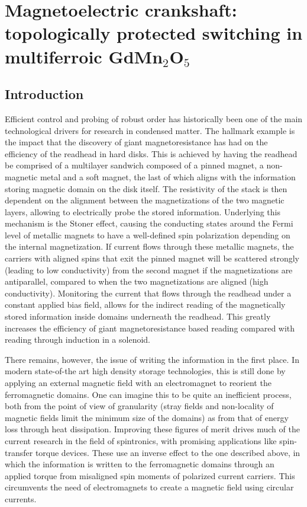 \newcommand{\Jpar}{J_{||}}
\newcommand{\Jperp}{J_{\perp}}
\chapter{Magnetoelectric crankshaft: topologically protected switching in multiferroic GdMn$_2$O$_5$ \label{ch:GdMn2O5}}
\section{Introduction}
Efficient control and probing of robust order has historically been one of the main technological drivers for research in condensed matter.
The hallmark example is the impact that the discovery of giant magnetoresistance has had on the efficiency of the readhead in hard disks.
This is achieved by having the readhead be comprised of a multilayer sandwich composed of a pinned magnet, a non-magnetic metal and a soft magnet, the last of which aligns with the information storing magnetic domain on the disk itself.
The resistivity of the stack is then dependent on the alignment between the magnetizations of the two magnetic layers, allowing to electrically probe the stored information. 
Underlying this mechanism is the Stoner effect, causing the conducting states around the Fermi level of metallic magnets to have a well-defined spin polarization depending on the internal magnetization.
If current flows through these metallic magnets, the carriers with aligned spins that exit the pinned magnet will be scattered strongly (leading to low conductivity) from the second magnet if the magnetizations are antiparallel, compared to when the two magnetizations are aligned (high conductivity).
Monitoring the current that flows through the readhead under a constant applied bias field, allows for the indirect reading of the magnetically stored information inside domains underneath the readhead.
This greatly increases the efficiency of giant magnetoresistance based reading compared with reading through induction in a solenoid.

There remains, however, the issue of writing the information in the first place.
In modern state-of-the art high density storage technologies, this is still done by applying an external magnetic field with an electromagnet to reorient the ferromagnetic domains. One can imagine this to be quite an inefficient process, both from the point of view of granularity (stray fields and non-locality of magnetic fields limit the minimum size of the domains) as from that of energy loss through heat dissipation.
Improving these figures of merit drives much of the current research in the field of spintronics, with promising applications like spin-transfer torque devices.
These use an inverse effect to the one described above, in which the information is written to the ferromagnetic domains through an applied torque from misaligned spin moments of polarized current carriers. This circumvents the need of electromagnets to create a magnetic field using circular currents.

